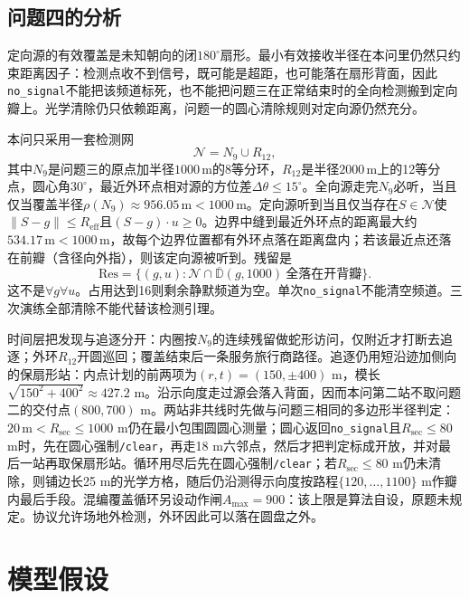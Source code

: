 \documentclass{cumcmthesis}
\begin{document}
\subsection{问题四的分析}

定向源的有效覆盖是未知朝向的闭$180^\circ$扇形。最小有效接收半径在本问里仍然只约束距离因子：检测点收不到信号，既可能是超距，也可能落在扇形背面，因此\texttt{no\_signal}不能把该频道标死，也不能把问题三在正常结束时的全向检测搬到定向瓣上。光学清除仍只依赖距离，问题一的圆心清除规则对定向源仍然充分。

本问只采用一套检测网
\[
\mathcal{N}=N_9\cup R_{12},
\]
其中$N_9$是问题三的原点加半径$1000\,\mathrm{m}$的8等分环，$R_{12}$是半径$2000\,\mathrm{m}$上的12等分点，圆心角$30^\circ$，最近外环点相对源的方位差$\Delta\theta\le 15^\circ$。全向源走完$N_9$必听，当且仅当覆盖半径$\rho(N_9)\approx 956.05\,\mathrm{m}<1000\,\mathrm{m}$。定向源听到当且仅当存在$S\in\mathcal{N}$使$\|S-g\|\le R_{\mathrm{eff}}$且$(S-g)\cdot u\ge 0$。边界中缝到最近外环点的距离最大约$534.17\,\mathrm{m}<1000\,\mathrm{m}$，故每个边界位置都有外环点落在距离盘内；若该最近点还落在前瓣（含径向外指），则该定向源被听到。残留是
\[
\mathrm{Res}=\bigl\{(g,u):\mathcal{N}\cap\overline{\mathbb{D}}(g,1000)\ \text{全落在开背瓣}\bigr\}.
\]
这不是$\forall g\forall u$。占用达到16则剩余静默频道为空。单次\texttt{no\_signal}不能清空频道。三次演练全部清除不能代替该检测引理。

时间层把发现与追逐分开：内圈按$N_9$的连续残留做蛇形访问，仅附近才打断去追逐；外环$R_{12}$开圆巡回；覆盖结束后一条服务旅行商路径。追逐仍用短沿迹加侧向的保扇形站：内点计划的前两项为$(r,t)=(150,\pm 400)$ m，模长$\sqrt{150^2+400^2}\approx 427.2$ m。沿示向度走过源会落入背面，因而本问第二站不取问题二的交付点$(800,700)$ m。两站非共线时先做与问题三相同的多边形半径判定：$20\,\mathrm{m}<R_{\mathrm{sec}}\le 1000$ m仍在最小包围圆圆心测量；圆心返回\texttt{no\_signal}且$R_{\mathrm{sec}}\le 80$ m时，先在圆心强制\texttt{/clear}，再走18 m六邻点，然后才把判定标成开放，并对最后一站再取保扇形站。循环用尽后先在圆心强制\texttt{/clear}；若$R_{\mathrm{sec}}\le 80$ m仍未清除，则铺边长25 m的光学方格，随后仍沿测得示向度按路程$\{120,\ldots,1100\}$ m作瓣内最后手段。混编覆盖循环另设动作闸$A_{\max}=900$：该上限是算法自设，原题未规定。协议允许场地外检测，外环因此可以落在圆盘之外。

\section{模型假设}
\end{document}
